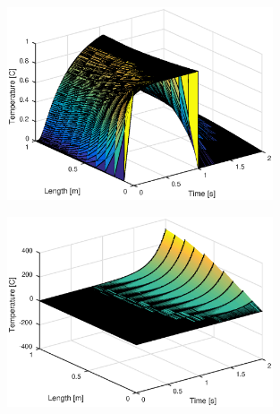 

\begin{figure}[!h]
\centering
\includegraphics[width = 0.7\textwidth]{./stable.eps}
\caption{}
\label{}
\end{figure}

\begin{figure}[!h]
\centering
\includegraphics[width = 0.7\textwidth]{./unstable.eps}
\caption{}
\label{}
\end{figure}

